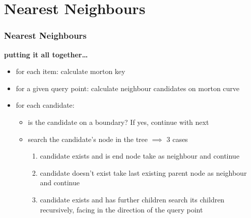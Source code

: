 \section{Nearest Neighbours}
\begin{frame}
    \frametitle{Nearest Neighbours}
    \textbf{putting it all together\dots}
    \begin{itemize}
        \item for each item: calculate morton key \\
        \item for a given query point: calculate neighbour candidates on morton
            curve \\
        \item for each candidate: \\
        \begin{itemize}
            \item is the candidate on a boundary? If yes, continue with next \\
            \item search the candidate's node in the tree $\implies$ 3 cases \\
            \begin{enumerate}
                \item candidate exists and is end node \textrightarrow take as
                    neighbour and continue \\
                \item candidate doesn't exist \textrightarrow take last
                    existing parent node as neighbour and continue \\
                \item candidate exists and has further children \textrightarrow
                    search its children recursively, facing in the direction of
                    the query point
            \end{enumerate}
        \end{itemize}
    \end{itemize}
\end{frame}

\begin{frame}
    
\end{frame}
